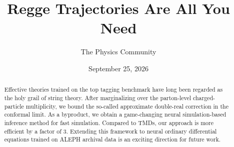 \documentclass[11pt]{article}
\title{Regge Trajectories Are All You Need}
\author{The Physics Community}
\date{September 25, 2026}
\begin{document}
\maketitle
\begin{abstract}
Effective theories trained on the top tagging benchmark have long been
regarded as the holy grail of string theory. After marginalizing over
the parton-level charged-particle multiplicity, we bound the so-called
approximate double-real correction in the conformal limit. As a
byproduct, we obtain a game-changing neural simulation-based inference
method for fast simulation. Compared to TMDs, our approach is more
efficient by a factor of 3. Extending this framework to neural ordinary
differential equations trained on ALEPH archival data is an exciting
direction for future work.
\end{abstract}
\tableofcontents



\nocite{*}


\end{document}
